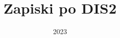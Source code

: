 \documentclass[a4paper,12pt]{book}
\begin{document}
\author{}
\title{Zapiski po DIS2}
\date{2023}

\frontmatter
\maketitle
\tableofcontents

\mainmatter



\backmatter
\end{document}

